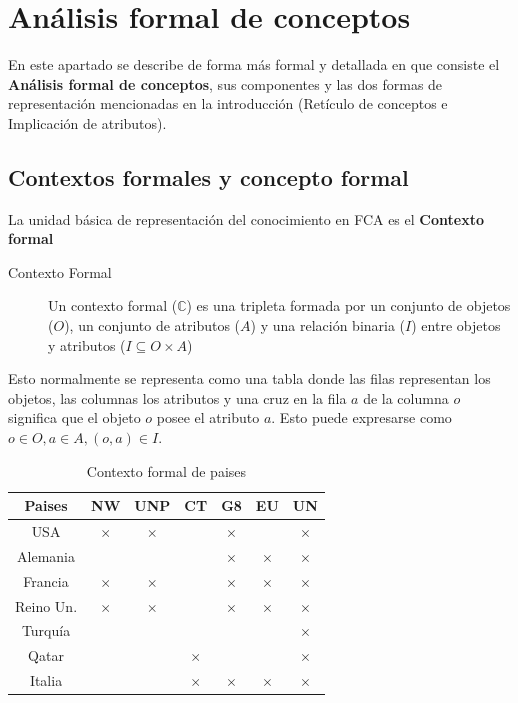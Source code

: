
\chapter*{Análisis formal de conceptos}

	En este apartado se describe de forma más formal y detallada en que consiste el \textbf{Análisis formal de conceptos}, sus componentes y las dos formas de representación mencionadas en la introducción (Retículo de conceptos e Implicación de atributos).
	

\section*{Contextos formales y concepto formal}

	
	La unidad básica de representación del conocimiento en FCA es el \textbf{Contexto formal}
	
	\begin{description}
		\item[Contexto Formal] Un contexto formal ($ \mathbb{C} $) es una tripleta formada por un conjunto de objetos ($O$), un conjunto de atributos ($A$) y una relación binaria ($I$) entre objetos y atributos ($I \subseteq O \times A $)
	\end{description}

	Esto normalmente se representa como una tabla donde las filas representan los objetos, las columnas los atributos y una cruz en la fila $a$ de la columna $o$ significa que el objeto $o$ posee el atributo $a$. Esto puede expresarse como $o \in O, a \in A, (o, a)\in I$.
	
	\begin{table}
		\centering
		\begin{tabular}{|c||c|c|c|c|c|c|}
			\hline 
			Paises & NW & UNP & CT & G8 & EU & UN \\ 
			\hline 	
			\hline 
			USA & $\times$ & $\times$ &  & $\times$ &  & $\times$ \\ 
			\hline 
			Alemania &  &  &  & $\times$ & $\times$ & $\times$ \\ 
			\hline 
			Francia & $\times$ & $\times$ &  & $\times$ & $\times$ & $\times$ \\ 
			\hline 
			Reino Un. & $\times$ & $\times$ &  & $\times$ & $\times$ & $\times$ \\ 
			\hline 
			Turquía &  &  &  &  &  & $\times$ \\ 
			\hline 
			Qatar &  &  & $\times$ &  &  & $\times$ \\ 
			\hline 
			Italia &  &  & $\times$ & $\times$ & $\times$ & $\times$ \\ 
			\hline 
		\end{tabular} 
		\caption{Contexto formal de paises}
		\label{tabla_paises}
	\end{table}

